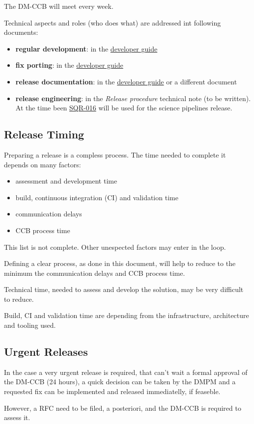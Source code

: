 The DM-CCB will meet every week.

Technical aspects and roles (who does what) are addressed int following documents:

\begin{itemize}
\item {\bf regular development}: in the \href{https://developer.lsst.io/}{developer guide}
\item {\bf fix porting}: in the \href{https://developer.lsst.io/}{developer guide}
\item {\bf release documentation}: in the \href{https://developer.lsst.io/}{developer guide} or a different document
\item {\bf release engineering}: in the {\it Release procedure} technical note (to be written). At the time been \href{https://sqr-016.lsst.io/}{SQR-016} will be used for the science pipelines release.
\end{itemize}

\subsection{Release Timing}

Preparing a release is a compless process.
The time needed to complete it depends on many factors:

\begin{itemize}
\item assessment and development time
\item build, continuous integration (CI) and validation time
\item communication delays
\item CCB process time
\end{itemize}

This list is not complete. Other unespected factors may enter in the loop.

Defining a clear process, as done in this document, will help to reduce to the minimum the communication delays and CCB process time.

Technical time, needed to assess and develop the solution, may be very difficult to reduce.

Build, CI and validation time are depending from the infrastructure, architecture and tooling used. 

\subsection{Urgent Releases}

In the case a very urgent release is required, that can't wait a formal approval of the DM-CCB (24 hours), 
a quick decision can be taken by the DMPM and a requested fix can be implemented and released immediatelly, if feaseble.

However, a RFC need to be filed, a posteriori, and the DM-CCB is required to assess it.

